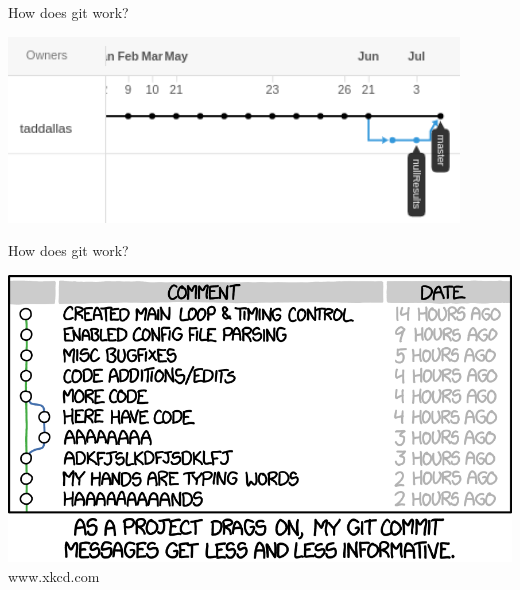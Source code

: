 \documentclass[12pt]{beamer}
\begin{document}
\begin{frame}

	\begin{flushright}
		\Large \textcolor{boss2}{How does git work?} 
	\end{flushright}

	\begin{center}
	  \includegraphics[width=\textwidth]{figs/gitHistory.png}
	\end{center}

\end{frame}





\begin{frame}

	\begin{flushright}
		\Large \textcolor{boss2}{How does git work?} 
	\end{flushright}

	\begin{center}
	  \includegraphics[width=\textwidth]{figs/commit.png}
		www.xkcd.com
	\end{center}

\end{frame}
\end{document}
